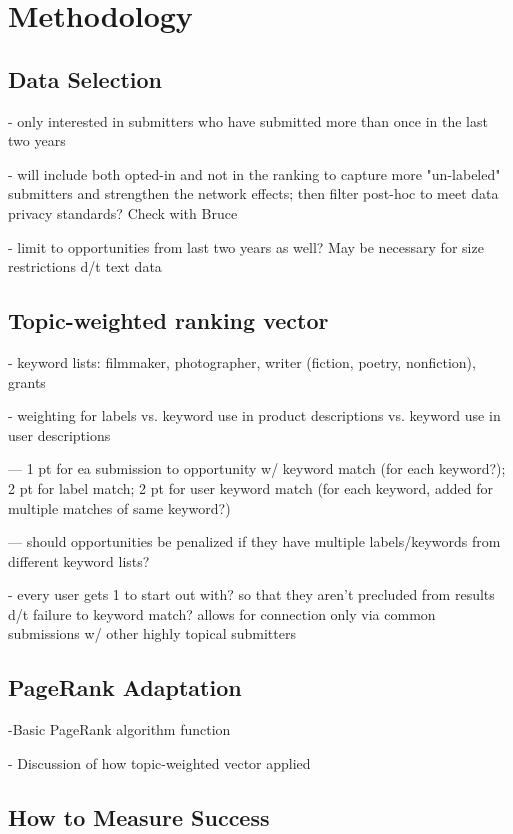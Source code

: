 \documentclass[]{report}   %
\begin{document}
\chapter{Methodology}

\section{Data Selection}

- only interested in submitters who have submitted more than once in the last two years

- will include both opted-in and not in the ranking to capture more "un-labeled" submitters and strengthen the network effects; then filter post-hoc to meet data privacy standards? Check with Bruce

- limit to opportunities from last two years as well? May be necessary for size restrictions d/t text data

\section{Topic-weighted ranking vector}

- keyword lists: filmmaker, photographer, writer (fiction, poetry, nonfiction), grants

- weighting for labels vs. keyword use in product descriptions vs. keyword use in user descriptions

--- 1 pt for ea submission to opportunity w/ keyword match (for each keyword?); 2 pt for label match; 2 pt for user keyword match (for each keyword, added for multiple matches of same keyword?)

--- should opportunities be penalized if they have multiple labels/keywords from different keyword lists?

- every user gets 1 to start out with? so that they aren't precluded from results d/t failure to keyword match? allows for connection only via common submissions w/ other highly topical submitters

\section{PageRank Adaptation}

-Basic PageRank algorithm function

- Discussion of how topic-weighted vector applied

\section{How to Measure Success}
\end{document}
